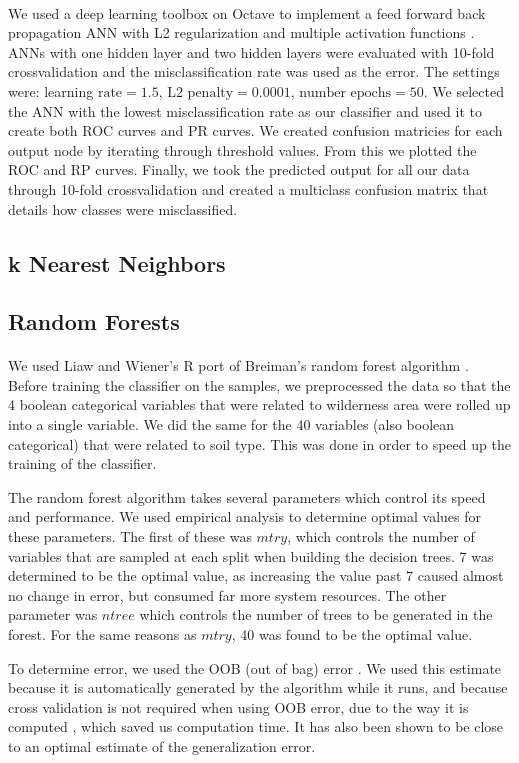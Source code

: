 \documentclass[11pt]{article}
\begin{document}
\paragraph{}
We used a deep learning toolbox on Octave to implement a feed forward back propagation ANN with L2 regularization and multiple activation functions \cite{rbp12}.  ANNs with one hidden layer and two hidden layers were evaluated with 10-fold crossvalidation and the misclassification rate was used as the error. The settings were: learning $ \text{rate} = 1.5$, $\text{L2 penalty} = 0.0001$, $\text{number epochs} = 50$. We selected the ANN with the lowest misclassification rate as our classifier and used it to create both ROC curves and PR curves.  We created confusion matricies for each output node by iterating through threshold values.  From this we plotted the ROC and RP curves.  Finally, we took the predicted output for all our data through 10-fold crossvalidation and created a multiclass confusion matrix that details how classes were misclassified.
\subsection{k Nearest Neighbors}


\subsection{Random Forests}
\paragraph{}
We used Liaw and Wiener's R port \cite{liaw02} of Breiman's random forest algorithm \cite{breiman01}. Before training the classifier on the samples, we preprocessed the data so that the 4 boolean categorical variables that were related to wilderness area were rolled up into a single variable. We did the same for the 40 variables (also boolean categorical) that were related to soil type. This was done in order to speed up the training of the classifier.
\par
The random forest algorithm takes several parameters which control its speed and performance. We used empirical analysis to determine optimal values for these parameters. The first of these was $mtry$, which controls the number of variables that are sampled at each split when building the decision trees. 7 was determined to be the optimal value, as increasing the value past 7 caused almost no change in error, but consumed far more system resources. The other parameter was $ntree$ which controls the number of trees to be generated in the forest. For the same reasons as $mtry$, 40 was found to be the optimal value.
\par
To determine error, we used the OOB (out of bag) error \cite{breiman96}. We used this estimate because it is automatically generated by the algorithm while it runs, and because cross validation is not required when using OOB error, due to the way it is computed \cite{breiman01, breiman96}, which saved us computation time. It has also been shown to be close to an optimal estimate of the generalization error\cite{breiman96}.
\end{document}

